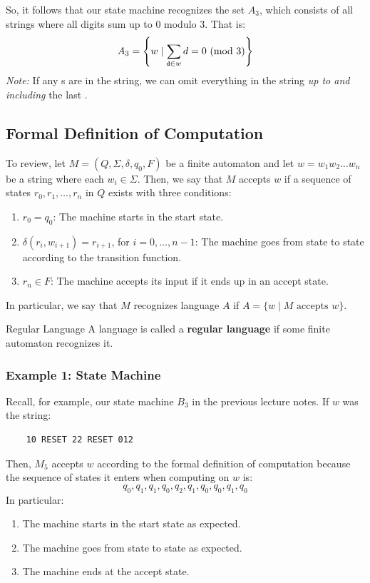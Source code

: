 \documentclass[letterpaper]{article}
\begin{document}
\bigskip

So, it follows that our state machine recognizes the set $A_3$, which consists of all strings where all digits sum up to 0 modulo 3. That is: 
\[A_3 = \left\{w \mid \sum_{\texttt{d} \in w} d = 0 \ (\mathrm{mod}\ 3)\right\}\]
\emph{Note:} If any s are in the string, we can omit everything in the string \emph{up to and including} the last .



\subsection{Formal Definition of Computation}
To review, let $M = (Q, \Sigma, \delta, q_0, F)$ be a finite automaton and let $w = w_1 w_2 \dots w_n$ be a string where each $w_i \in \Sigma$. Then, we say that $M$ accepts $w$ if a sequence of states $r_0, r_1, \dots, r_n$ in $Q$ exists with three conditions: 
\begin{enumerate}
    \item $r_0 = q_0$: The machine starts in the start state. 
    \item $\delta(r_i, w_{i + 1}) = r_{i + 1}$, for $i = 0, \dots, n - 1$: The machine goes from state to state according to the transition function. 
    \item $r_n \in F$: The machine accepts its input if it ends up in an accept state. 
\end{enumerate}
In particular, we say that $M$ recognizes language $A$ if $A = \{w \mid M \text{ accepts } w\}$.
\begin{definition}{Regular Language}{}
    A language is called a \textbf{regular language} if some finite automaton recognizes it.
\end{definition}

\subsubsection{Example 1: State Machine}
Recall, for example, our state machine $B_3$ in the previous lecture notes. If $w$ was the string:
\begin{verbatim}
    10 RESET 22 RESET 012
\end{verbatim}
Then, $M_5$ accepts $w$ according to the formal definition of computation because the sequence of states it enters when computing on $w$ is: 
\[q_0, q_1, q_1, q_0, q_2, q_1, q_0, q_0, q_1, q_0\]
In particular:
\begin{enumerate}
    \item The machine starts in the start state as expected. 
    \item The machine goes from state to state as expected. 
    \item The machine ends at the accept state. 
\end{enumerate}
\end{document}
